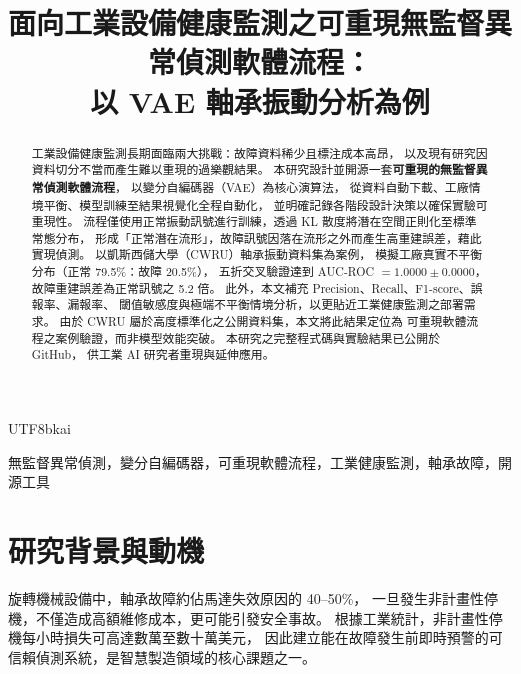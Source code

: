 \documentclass[conference]{IEEEtran}
\begin{document}
\begin{CJK}{UTF8}{bkai}

\title{面向工業設備健康監測之可重現無監督異常偵測軟體流程：\\
以 VAE 軸承振動分析為例}

\author{
}

\maketitle

\begin{abstract}
工業設備健康監測長期面臨兩大挑戰：故障資料稀少且標注成本高昂，
以及現有研究因資料切分不當而產生難以重現的過樂觀結果。
本研究設計並開源一套\textbf{可重現的無監督異常偵測軟體流程}，
以變分自編碼器（VAE）為核心演算法，
從資料自動下載、工廠情境平衡、模型訓練至結果視覺化全程自動化，
並明確記錄各階段設計決策以確保實驗可重現性。
流程僅使用正常振動訊號進行訓練，透過 KL 散度將潛在空間正則化至標準常態分布，
形成「正常潛在流形」，故障訊號因落在流形之外而產生高重建誤差，藉此實現偵測。
以凱斯西儲大學（CWRU）軸承振動資料集為案例，
模擬工廠真實不平衡分布（正常 79.5\%：故障 20.5\%），
五折交叉驗證達到 AUC-ROC $= \mathbf{1.0000 \pm 0.0000}$，
故障重建誤差為正常訊號之 5.2 倍。
此外，本文補充 Precision、Recall、F1-score、誤報率、漏報率、
閾值敏感度與極端不平衡情境分析，以更貼近工業健康監測之部署需求。
由於 CWRU 屬於高度標準化之公開資料集，本文將此結果定位為
可重現軟體流程之案例驗證，而非模型效能突破。
本研究之完整程式碼與實驗結果已公開於 GitHub，
供工業 AI 研究者重現與延伸應用。
\end{abstract}

\begin{IEEEkeywords}
無監督異常偵測，變分自編碼器，可重現軟體流程，工業健康監測，軸承故障，開源工具
\end{IEEEkeywords}

\section{研究背景與動機}

旋轉機械設備中，軸承故障約佔馬達失效原因的 40--50\%\cite{smith2015rolling}，
一旦發生非計畫性停機，不僅造成高額維修成本，更可能引發安全事故。
根據工業統計，非計畫性停機每小時損失可高達數萬至數十萬美元，
因此建立能在故障發生前即時預警的可信賴偵測系統，是智慧製造領域的核心課題之一。


\end{CJK}
\end{document}
